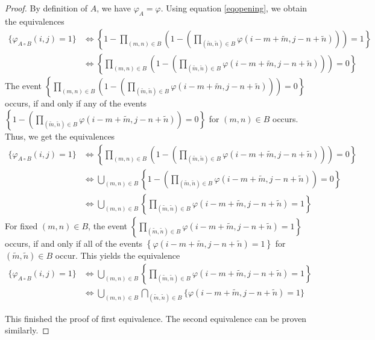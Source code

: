 \documentclass[a4paper,12pt]{article}
\theoremstyle{plain}
\theoremstyle{definition}
\theoremstyle{remark}
\begin{document}
\begin{proof}
	By definition of $A$, we have $\varphi_A = \varphi$. Using equation \eqref{eqopening}, we obtain the equivalences
	\begin{align*}
		\{ \varphi_{A \circ B}(i, j) = 1 \} &\Leftrightarrow \left\{ 1 - \prod_{(m, n) \in B} \left( 1 - \left( \prod_{(\tilde{m}, \tilde{n}) \in B} \varphi(i - m + \tilde{m}, j - n + \tilde{n}) \right) \right) = 1 \right\} \\
		&\Leftrightarrow \left\{ \prod_{(m, n) \in B} \left( 1 - \left( \prod_{(\tilde{m}, \tilde{n}) \in B} \varphi(i - m + \tilde{m}, j - n + \tilde{n}) \right) \right) = 0 \right\}
	\end{align*}
	The event $\left\{ \prod_{(m, n) \in B} \left( 1 - \left( \prod_{(\tilde{m}, \tilde{n}) \in B} \varphi(i - m + \tilde{m}, j - n + \tilde{n}) \right) \right) = 0 \right\}$ occurs, if and only if any of the events $\left\{ 1 - \left( \prod_{(\tilde{m}, \tilde{n}) \in B} \varphi(i - m + \tilde{m}, j - n + \tilde{n}) \right) = 0 \right\}$ for $(m, n) \in B$ occurs. Thus, we get the equivalences
	\begin{align*}
		\{ \varphi_{A \circ B}(i, j) = 1 \} &\Leftrightarrow \left\{ \prod_{(m, n) \in B} \left( 1 - \left( \prod_{(\tilde{m}, \tilde{n}) \in B} \varphi(i - m + \tilde{m}, j - n + \tilde{n}) \right) \right) = 0 \right\} \\
		&\Leftrightarrow \bigcup_{(m, n) \in B} \left\{ 1 - \left( \prod_{(\tilde{m}, \tilde{n}) \in B} \varphi(i - m + \tilde{m}, j - n + \tilde{n}) \right) = 0 \right\} \\
		&\Leftrightarrow \bigcup_{(m, n) \in B} \left\{ \prod_{(\tilde{m}, \tilde{n}) \in B} \varphi(i - m + \tilde{m}, j - n + \tilde{n}) = 1 \right\}
	\end{align*}
	For fixed $(m, n) \in B$, the event $\left\{ \prod_{(\tilde{m}, \tilde{n}) \in B} \varphi(i - m + \tilde{m}, j - n + \tilde{n}) = 1 \right\}$ occurs, if and only if all of the events $\left\{ \varphi(i - m + \tilde{m}, j - n + \tilde{n}) = 1 \right\}$ for $(\tilde{m}, \tilde{n}) \in B$ occur. This yields the equivalence
	\begin{align*}
		\{ \varphi_{A \circ B}(i, j) = 1 \} &\Leftrightarrow \bigcup_{(m, n) \in B} \left\{ \prod_{(\tilde{m}, \tilde{n}) \in B} \varphi(i - m + \tilde{m}, j - n + \tilde{n}) = 1 \right\} \\
		&\Leftrightarrow \bigcup_{(m, n) \in B} \bigcap_{(\tilde{m}, \tilde{n}) \in B} \{ \varphi(i - m + \tilde{m}, j - n + \tilde{n}) = 1 \}
	\end{align*}
	
	This finished the proof of first equivalence. The second equivalence can be proven similarly.
\end{proof}
\end{document}
